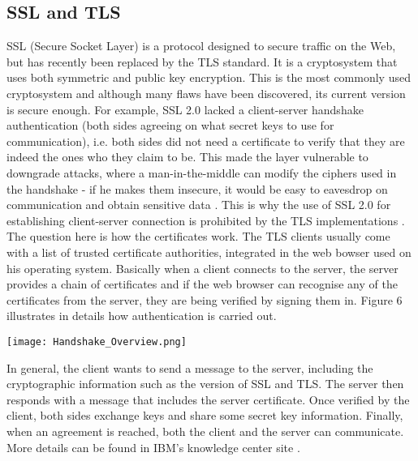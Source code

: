 \documentclass[a4paper, 12pt, titlepage]{article}
\begin{document}
\subsection{SSL and TLS}
SSL (Secure Socket Layer) is a protocol designed to secure traffic on the Web, but has recently been replaced by the TLS standard. It is a cryptosystem that uses both symmetric and public key encryption. This is the most commonly used cryptosystem and although many flaws have been discovered, its current version is secure enough. For example, SSL 2.0 lacked a client-server handshake authentication (both sides agreeing on what secret keys to use for communication), i.e. both sides did not need a certificate to verify that they are indeed the ones who they claim to be. This made the layer vulnerable to downgrade attacks, where a man-in-the-middle can modify the ciphers used in the handshake - if he makes them insecure, it would be easy to eavesdrop on communication and obtain sensitive data \cite{Crypto101}. This is why the use of SSL 2.0 for establishing client-server connection is prohibited by the TLS implementations \cite{SSL2Support}. \\[6pt]
The question here is how the certificates work. The TLS clients usually come with a list of trusted certificate authorities, integrated in the web bowser used on his operating system. Basically when a client connects to the server, the server provides a chain of certificates and if the web browser can recognise any of the certificates from the server, they are being verified by signing them in. Figure 6 illustrates in details how authentication is carried out. \\[6pt]

\begin{center}
\texttt{[image: Handshake\_Overview.png]}
\label{fig:Tor}
\end{center}
In general, the client wants to send a message to the server, including the cryptographic information such as the version of SSL and TLS. The server then responds with a message that includes the server certificate. Once verified by the client, both sides exchange keys and share some secret key information. Finally, when an agreement is reached, both the client and the server can communicate. More details can be found in IBM's knowledge center site \cite{HandshakeOverview}. 
\end{document}
